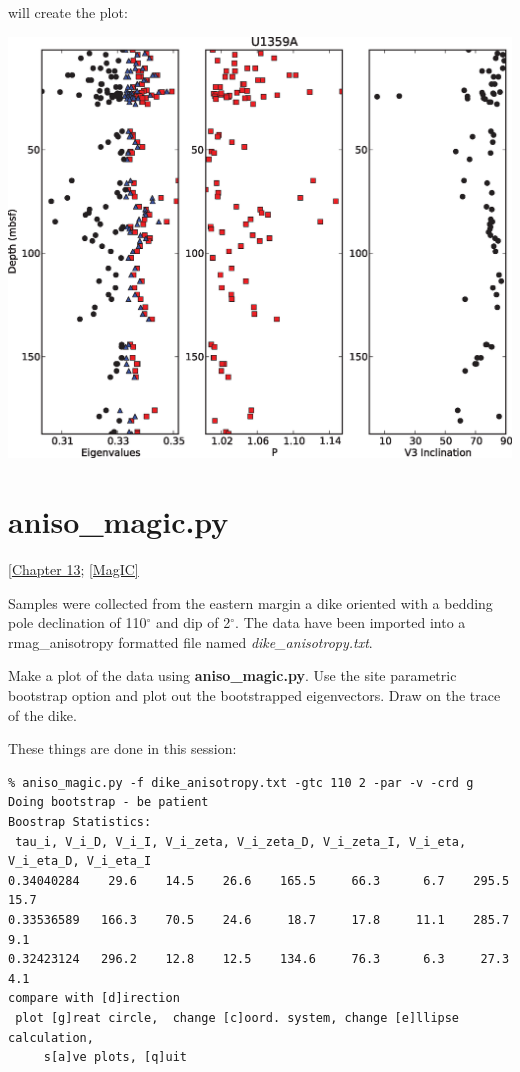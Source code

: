 \documentclass[11pt]{book}
\begin{document}
{{{{\noindent will create the plot:

\includegraphics[width=15 cm]{EPSfiles/ani-depthplot.eps}

\section {\bf aniso\_magic.py} 
[\href{http://magician.ucsd.edu/Essentials/WebBook2.html#Paleomagnetic_tensors}{Chapter 13}; 
\href{#MagIC}{[MagIC]}
\label{ex:aniso_magic} 

Samples were collected from the eastern margin a dike  oriented  with a bedding pole declination of 110$^{\circ}$ and dip of 2$^{\circ}$.      The data have been imported into a rmag\_anisotropy formatted file named {\it dike\_anisotropy.txt}.    

Make a plot of the data using {\bf aniso\_magic.py}.  Use the site parametric bootstrap option and plot out the bootstrapped eigenvectors.   Draw on the trace of the dike.   

These things  are done in this session: 

\begin{verbatim}
% aniso_magic.py -f dike_anisotropy.txt -gtc 110 2 -par -v -crd g
Doing bootstrap - be patient
Boostrap Statistics: 
 tau_i, V_i_D, V_i_I, V_i_zeta, V_i_zeta_D, V_i_zeta_I, V_i_eta, V_i_eta_D, V_i_eta_I
0.34040284    29.6    14.5    26.6    165.5     66.3      6.7    295.5     15.7 
0.33536589   166.3    70.5    24.6     18.7     17.8     11.1    285.7      9.1 
0.32423124   296.2    12.8    12.5    134.6     76.3      6.3     27.3      4.1 
compare with [d]irection 
 plot [g]reat circle,  change [c]oord. system, change [e]llipse calculation,  
     s[a]ve plots, [q]uit 


\end{verbatim}}}}}
\end{document}
